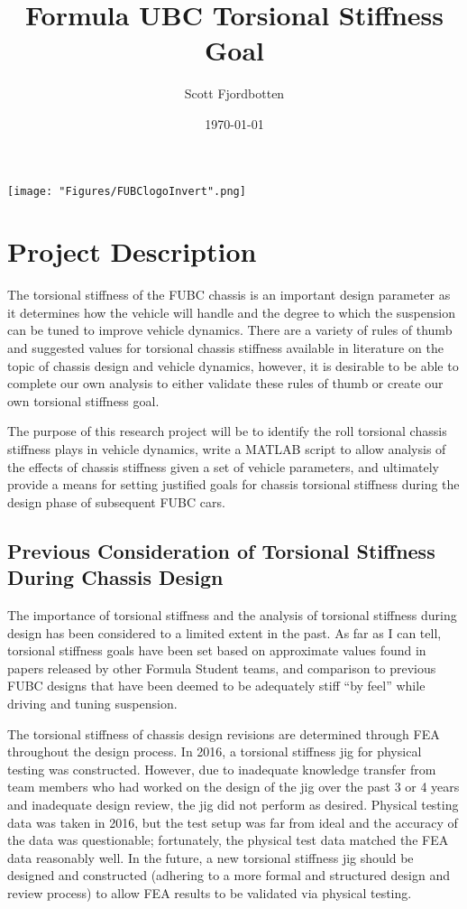 \documentclass[a4paper]{article}
\title{Formula UBC Torsional Stiffness Goal}
\author{Scott Fjordbotten}
\date{\today}
\numberwithin{equation}{section}
\begin{document}
	\maketitle 
	\begin{figure*}[h]
		\texttt{[image: "Figures/FUBClogoInvert".png]}
	\end{figure*}

	\newpage
	\tableofcontents
	\listoffigures

\newpage
	
\section{Project Description} \label{Project Description}
The torsional stiffness of the FUBC chassis is an important design parameter as it determines how the vehicle will handle and the degree to which the suspension can be tuned to improve vehicle dynamics. There are a variety of rules of thumb and suggested values for torsional chassis stiffness available in literature on the topic of chassis design and vehicle dynamics, however, it is desirable to be able to complete our own analysis to either validate these rules of thumb or create our own torsional stiffness goal.

The purpose of this research project will be to identify the roll torsional chassis stiffness plays in vehicle dynamics, write a MATLAB script to allow analysis of the effects of chassis stiffness given a set of vehicle parameters, and ultimately provide a means for setting justified goals for chassis torsional stiffness during the design phase of subsequent FUBC cars.

\subsection{Previous Consideration of Torsional Stiffness During Chassis Design} \label{Previous Consideration of Torsional Stiffness During Chassis Design}
The importance of torsional stiffness and the analysis of torsional stiffness during design has been considered to a limited extent in the past. As far as I can tell, torsional stiffness goals have been set based on approximate values found in papers released by other Formula Student teams, and comparison to previous FUBC designs that have been deemed to be adequately stiff “by feel” while driving and tuning suspension.

The torsional stiffness of chassis design revisions are determined through FEA throughout the design process. In 2016, a torsional stiffness jig for physical testing was constructed. However, due to inadequate knowledge transfer from team members who had worked on the design of the jig over the past 3 or 4 years and inadequate design review, the jig did not perform as desired. Physical testing data was taken in 2016, but the test setup was far from ideal and the accuracy of the data was questionable; fortunately, the physical test data matched the FEA data reasonably well. In the future, a new torsional stiffness jig should be designed and constructed (adhering to a more formal and structured design and review process) to allow FEA results to be validated via physical testing.
\end{document}

